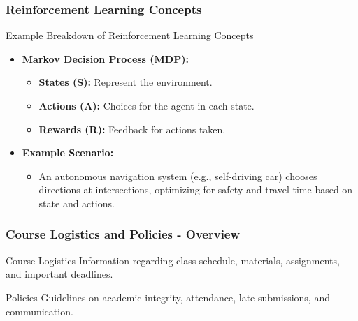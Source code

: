 \documentclass[aspectratio=169]{beamer}
\begin{document}
\begin{frame}[fragile]
    \frametitle{Reinforcement Learning Concepts}
    \begin{block}{Example Breakdown of Reinforcement Learning Concepts}
        \begin{itemize}
            \item \textbf{Markov Decision Process (MDP):}
                \begin{itemize}
                    \item \textbf{States (S):} Represent the environment.
                    \item \textbf{Actions (A):} Choices for the agent in each state.
                    \item \textbf{Rewards (R):} Feedback for actions taken.
                \end{itemize}
            \item \textbf{Example Scenario:}
                \begin{itemize}
                    \item An autonomous navigation system (e.g., self-driving car) chooses directions at intersections, optimizing for safety and travel time based on state and actions.
                \end{itemize}
        \end{itemize}
    \end{block}
\end{frame}

\begin{frame}[fragile]
  \frametitle{Course Logistics and Policies - Overview}
  \begin{block}{Course Logistics}
    Information regarding class schedule, materials, assignments, and important deadlines.
  \end{block}

  \begin{block}{Policies}
    Guidelines on academic integrity, attendance, late submissions, and communication.
  \end{block}
\end{frame}
\end{document}
